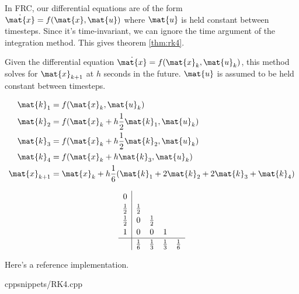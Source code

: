 In FRC, our differential equations are of the form
$\dot{\mat{x}} = f(\mat{x}, \mat{u})$ where $\mat{u}$ is held constant between
timesteps. Since it's time-invariant, we can ignore the time argument of the
integration method. This gives theorem \ref{thm:rk4}.
\begin{theorem}
  \label{thm:rk4}

  Given the differential equation $\dot{\mat{x}} = f(\mat{x}_k, \mat{u}_k)$,
  this method solves for $\mat{x}_{k+1}$ at $h$ seconds in the future.
  $\mat{u}$ is assumed to be held constant between timesteps.
  \begin{center}
    \begin{minipage}{0.35\linewidth}
      \centering
      \begin{align*}
        \mat{k}_1 &= f(\mat{x}_k, \mat{u}_k) \\
        \mat{k}_2 &= f(\mat{x}_k + h \frac{1}{2}\mat{k}_1, \mat{u}_k) \\
        \mat{k}_3 &= f(\mat{x}_k + h \frac{1}{2}\mat{k}_2, \mat{u}_k) \\
        \mat{k}_4 &= f(\mat{x}_k + h \mat{k}_3, \mat{u}_k) \\
        \mat{x}_{k+1} &= \mat{x}_k + h \frac{1}{6} (\mat{k}_1 + 2\mat{k}_2 +
          2\mat{k}_3 + \mat{k}_4)
      \end{align*}
    \end{minipage}
    \quad
    \begin{minipage}{0.35\linewidth}
      \centering
      \begin{equation*}
        \renewcommand\arraystretch{1.2}
        \begin{array}{c|cccc}
          0 \\
          \frac{1}{2} & \frac{1}{2} \\
          \frac{1}{2} & 0 & \frac{1}{2} \\
          1 & 0 & 0 & 1 \\
          \hline
          & \frac{1}{6} & \frac{1}{3} & \frac{1}{3} & \frac{1}{6}
        \end{array}
      \end{equation*}
    \end{minipage}
  \end{center}
\end{theorem}

Here's a reference implementation.
\begin{coderemote}{cpp}{snippets/RK4.cpp}
  \caption{RK4 implementation in C++}
\end{coderemote}

